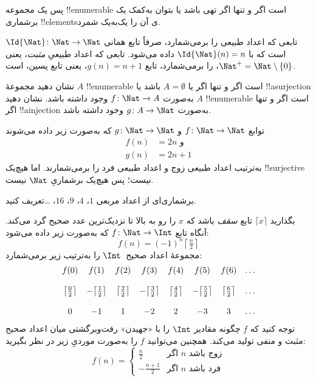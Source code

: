 \documentclass[../../../include/open-logic-section]{subfiles}
\begin{document}
\begin{explain}
پس یک مجموعه !!{enumerable} است اگر و تنها اگر تهی باشد یا بتوان
به‌کمک یک برشماری !!{element}sی آن را یک‌به‌یک شمرد.
\end{explain}

\begin{ex}
تابعی که اعداد طبیعی را برمی‌شمارد، صرفاً تابع همانی
$\Id{\Nat} \colon \Nat \to \Nat$ است که با $\Id{\Nat}(n) = n$ داده
می‌شود. تابعی که اعداد طبیعیِ \emph{مثبت}، یعنی $\Nat^+ =
\Nat \setminus \{0\}$، را برمی‌شمارد، تابع $g(n) = n + 1$، یعنی تابع
پسین، است.
\end{ex}

\begin{prob}
نشان دهید مجموعهٔ $A$ !!{enumerable} است اگر و تنها اگر یا
$A = \emptyset$ باشد یا !!a{surjection} به‌صورت $f\colon \Nat \to A$
وجود داشته باشد. نشان دهید $A$ !!{enumerable} است اگر و تنها اگر
!!a{injection} به‌صورت $g\colon A \to \Nat$ وجود داشته باشد.
\end{prob}

\begin{ex}
توابع $f\colon \Nat \to \Nat$ و $g \colon \Nat \to \Nat$ که
به‌صورت زیر داده می‌شوند
\begin{align*}
  f(n) & = 2n \text{ و}\\
  g(n) & = 2n+1
\end{align*}
به‌ترتیب اعداد طبیعی زوج و اعداد طبیعی فرد را برمی‌شمارند. اما هیچ‌یک
!!{surjective} نیست؛ پس هیچ‌یک برشماریِ $\Nat$ نیست.
\end{ex}

\begin{prob}
برشماری‌ای از اعداد مربعی $1$، $4$، $9$، $16$، \dots تعریف کنید.
\end{prob}

\begin{ex}
بگذارید $\lceil x \rceil$ تابع \emph{سقف} باشد که $x$ را رو به بالا
تا نزدیک‌ترین عدد صحیح گرد می‌کند. آنگاه تابع $f \colon \Nat \to \Int$
که به‌صورت زیر داده می‌شود:
\[
  f(n) = (-1)^{n} \left\lceil\tfrac{n}{2}\right\rceil
\]
مجموعهٔ اعداد صحیح~$\Int$ را به‌ترتیب زیر برمی‌شمارد:
\[
\begin{array}{c c c c c c c c}
f(0) & f(1) & f(2) & f(3) & f(4) & f(5) & f(6) & \dots \\ \\
\big\lceil \tfrac{0}{2} \big\rceil & -\big\lceil \tfrac{1}{2}\big\rceil &  \big\lceil \tfrac{2}{2} \big\rceil & -\big\lceil \tfrac{3}{2} \big\rceil & \big\lceil \tfrac{4}{2} \big\rceil  & -\big\lceil \tfrac{5}{2}\big\rceil & \big\lceil \tfrac{6}{2} \big\rceil & \dots \\ \\
0 & -1 & 1 & -2 & 2 & -3 & 3& \dots
\end{array}
\]
توجه کنید که $f$ چگونه مقادیر $\Int$ را با «جهیدن» رفت‌وبرگشتی
میان اعداد صحیح مثبت و منفی تولید می‌کند. همچنین می‌توانید $f$ را
به‌صورت موردیِ زیر در نظر بگیرید:
\[
f(n) = \begin{cases}
  \frac{n}{2} & \text{اگر $n$ زوج باشد}\\
  -\frac{n+1}{2} & \text{اگر $n$ فرد باشد}
  \end{cases}
\]
\end{ex}
\end{document}
